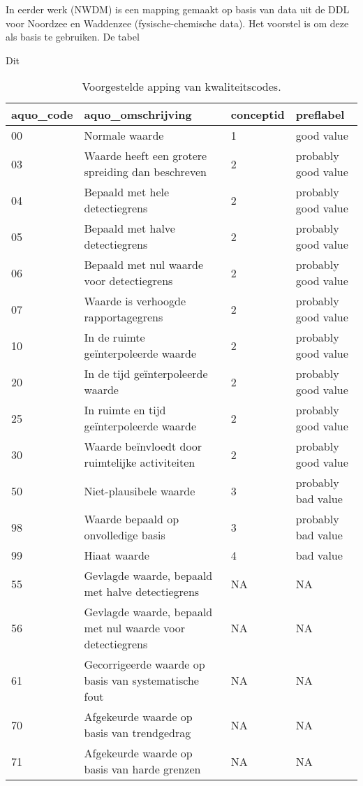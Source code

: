 \documentclass[
]{book}
\begin{document}
In eerder werk (NWDM) is een mapping gemaakt op basis van data uit de DDL voor Noordzee en Waddenzee (fysische-chemische data). Het voorstel is om deze als basis te gebruiken. De tabel

Dit

\begin{table}

\caption{\label{tab:Kwaliteitscodecomparison}Voorgestelde apping van kwaliteitscodes.}
\centering
\begin{tabular}[t]{l|l|l|l}
\hline
aquo\_code & aquo\_omschrijving & conceptid & preflabel\\
\hline
00 & Normale waarde & 1 & good value\\
\hline
03 & Waarde heeft een grotere spreiding dan beschreven & 2 & probably good value\\
\hline
04 & Bepaald met hele detectiegrens & 2 & probably good value\\
\hline
05 & Bepaald met halve detectiegrens & 2 & probably good value\\
\hline
06 & Bepaald met nul waarde voor detectiegrens & 2 & probably good value\\
\hline
07 & Waarde is verhoogde rapportagegrens & 2 & probably good value\\
\hline
10 & In de ruimte geïnterpoleerde waarde & 2 & probably good value\\
\hline
20 & In de tijd geïnterpoleerde waarde & 2 & probably good value\\
\hline
25 & In ruimte en tijd geïnterpoleerde waarde & 2 & probably good value\\
\hline
30 & Waarde beïnvloedt door ruimtelijke activiteiten & 2 & probably good value\\
\hline
50 & Niet-plausibele waarde & 3 & probably bad value\\
\hline
98 & Waarde bepaald op onvolledige basis & 3 & probably bad value\\
\hline
99 & Hiaat waarde & 4 & bad value\\
\hline
55 & Gevlagde waarde, bepaald met halve detectiegrens & NA & NA\\
\hline
56 & Gevlagde waarde, bepaald met nul waarde voor detectiegrens & NA & NA\\
\hline
61 & Gecorrigeerde waarde op basis van systematische fout & NA & NA\\
\hline
70 & Afgekeurde waarde op basis van trendgedrag & NA & NA\\
\hline
71 & Afgekeurde waarde op basis van harde grenzen & NA & NA\\

\end{tabular}
\end{table}
\end{document}
